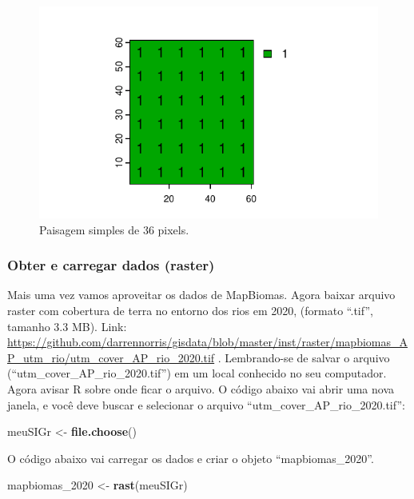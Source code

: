 \documentclass[
]{article}
\newenvironment{Shaded}{\begin{snugshade}}{\end{snugshade}}
\newcommand{\FunctionTok}[1]{\textcolor[rgb]{0.13,0.29,0.53}{\textbf{#1}}}
\newcommand{\NormalTok}[1]{#1}
\newcommand{\OtherTok}[1]{\textcolor[rgb]{0.56,0.35,0.01}{#1}}
\begin{document}
\begin{figure}
\centering
\includegraphics{epr_files/figure-latex/unnamed-chunk-242-1.pdf}
\caption{\label{fig:unnamed-chunk-242}Paisagem simples de 36 pixels.}
\end{figure}

\hypertarget{obter-e-carregar-dados-raster-1}{%
\subsubsection{Obter e carregar dados (raster)}\label{obter-e-carregar-dados-raster-1}}

Mais uma vez vamos aproveitar os dados de MapBiomas. Agora baixar arquivo raster com cobertura de terra no entorno dos rios em 2020, (formato ``.tif'', tamanho 3.3 MB). Link: \url{https://github.com/darrennorris/gisdata/blob/master/inst/raster/mapbiomas_AP_utm_rio/utm_cover_AP_rio_2020.tif} . Lembrando-se de salvar o arquivo (``utm\_cover\_AP\_rio\_2020.tif'') em um local conhecido no seu computador. Agora avisar R sobre onde ficar o arquivo. O código abaixo vai abrir uma nova janela, e você deve buscar e selecionar o arquivo ``utm\_cover\_AP\_rio\_2020.tif'':

\begin{Shaded}
\begin{Highlighting}[]
\NormalTok{meuSIGr }\OtherTok{\textless{}{-}} \FunctionTok{file.choose}\NormalTok{()}
\end{Highlighting}
\end{Shaded}

O código abaixo vai carregar os dados e criar o objeto ``mapbiomas\_2020''.

\begin{Shaded}
\begin{Highlighting}[]
\NormalTok{mapbiomas\_2020 }\OtherTok{\textless{}{-}} \FunctionTok{rast}\NormalTok{(meuSIGr)}
\end{Highlighting}
\end{Shaded}
\end{document}

